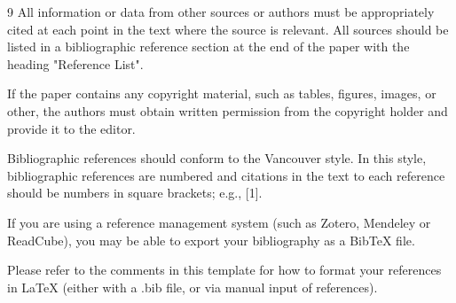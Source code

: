 \documentclass[10pt,twocolumn,letterpaper]{article}
\begin{document}
\newpage




\begin{thebibliography}{9}
All information or data from other sources or authors must be appropriately cited at each point in the text where the source is relevant. All sources should be listed in a bibliographic reference section at the end of the paper with the heading "Reference List". 

If the paper contains any copyright material, such as tables, figures, images, or other, the authors must obtain written permission from the copyright holder and provide it to the editor. 

Bibliographic references should conform to the Vancouver style. In this style, bibliographic references are numbered and citations in the text to each reference should be numbers in square brackets; e.g., [1]. 

If you are using a reference management system (such as Zotero, Mendeley or ReadCube), you may be able to export your bibliography as a Bib\TeX{} file. 

Please refer to the comments in this template for how to format your references in LaTeX (either with a .bib file, or via manual input of references).








\end{thebibliography}
\end{document}
